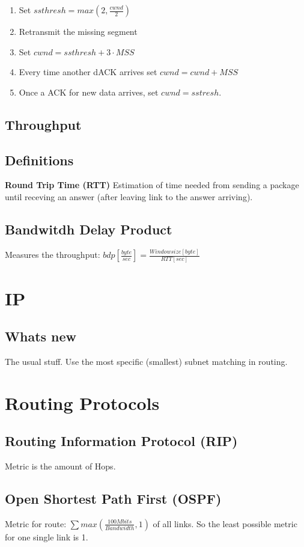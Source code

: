 \documentclass{article}
\begin{document}
\begin{enumerate}
     \item Set $ssthresh = max(2, \frac{cwnd}{2})$
     \item Retransmit the missing segment
     \item Set $cwnd = ssthresh + 3 \cdot MSS$
     \item Every time another dACK arrives set $cwnd = cwnd + MSS$
     \item Once a ACK for new data arrives, set $cwnd = sstresh$.
\end{enumerate}

\subsection{Throughput}
\subsection{Definitions}

\textbf{Round Trip Time (RTT)}
Estimation of time needed from sending a package until receving an answer (after leaving link to the answer arriving).

\subsection{Bandwitdh Delay Product}
Measures the throughput: $bdp [\frac{byte}{sec}] = \frac{Windowsize [byte]}{RTT [sec]}$

\section{IP}
\subsection{Whats new}
The usual stuff. Use the most specific (smallest) subnet matching in routing.

\section{Routing Protocols}
\subsection{Routing Information Protocol (RIP)}
Metric is the amount of Hops.

\subsection{Open Shortest Path First (OSPF)}
Metric for route: $\sum{max (\frac{100 Mbits}{Bandwidth}, 1)}$ of all links. So the least possible metric for one single link is 1.
\end{document}
